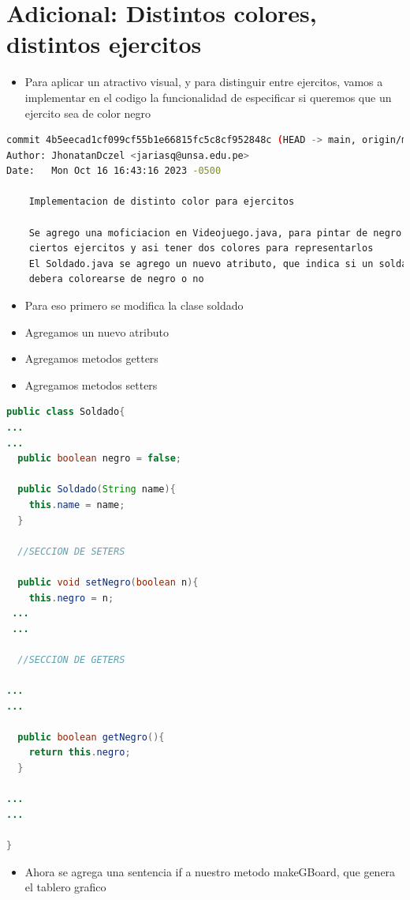 \section{Adicional: Distintos colores, distintos ejercitos}
\begin{itemize}
    \item Para aplicar un atractivo visual, y para distinguir entre ejercitos, vamos a implementar en el codigo la funcionalidad de especificar si queremos que un ejercito sea de color negro
\end{itemize}
\begin{lstlisting}[language=bash, caption={Commit principal}]
commit 4b5eecad1cf099cf55b1e66815fc5c8cf952848c (HEAD -> main, origin/main)
Author: JhonatanDczel <jariasq@unsa.edu.pe>
Date:   Mon Oct 16 16:43:16 2023 -0500

    Implementacion de distinto color para ejercitos

    Se agrego una moficiacion en Videojuego.java, para pintar de negro
    ciertos ejercitos y asi tener dos colores para representarlos
    El Soldado.java se agrego un nuevo atributo, que indica si un soldado
    debera colorearse de negro o no
\end{lstlisting}
\begin{itemize}
    \item Para eso primero se modifica la clase soldado
    \item Agregamos un nuevo atributo
    \item Agregamos metodos getters
    \item Agregamos metodos setters
\end{itemize}
\begin{lstlisting}[language=java, caption={Soldado.java}]
public class Soldado{
...
...
  public boolean negro = false;

  public Soldado(String name){
    this.name = name;
  }

  //SECCION DE SETERS

  public void setNegro(boolean n){
    this.negro = n;
 ...
 ...
 
  //SECCION DE GETERS

...
...

  public boolean getNegro(){
    return this.negro;
  }
  
...
...

}
\end{lstlisting}
\begin{itemize}
    \item Ahora se agrega una sentencia if a nuestro metodo makeGBoard, que genera el tablero grafico
\end{itemize}
